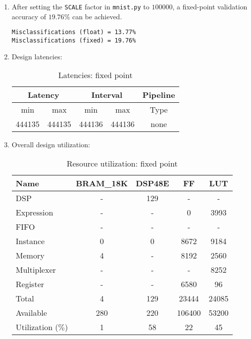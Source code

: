 \documentclass[../main.tex]{subfiles}
\begin{document}
\begin{enumerate}[label=(\arabic*)]
	\item After setting the \texttt{SCALE} factor in \texttt{mnist.py} to $100000$, a fixed-point validation accuracy of $19.76\%$ can be achieved.
		\lstset{
			language=bash,
			basicstyle=\ttfamily
		}
		\begin{lstlisting}
Misclassifications (float) = 13.77%
Misclassifications (fixed) = 19.76%
		\end{lstlisting}

	\item Design latencies:

\begin{table}[H]
	\centering
	\begin{tabular}{ccccc}
		\multicolumn{2}{c}{Latency} & \multicolumn{2}{c}{Interval} & Pipeline\\
		\hline
		min  &   max  &   min  &   max  &   Type  \\
		444135&  444135&  444136&  444136&   none  
	\end{tabular}
	\caption{Latencies: fixed point}
	\label{2-perf-table}
\end{table}

\item Overall design utilization:
\begin{table}[H]
	\centering
	\begin{tabular}{lcccc}
		Name      & BRAM\_18K& DSP48E&   FF   &  LUT  \\
		\hline
		DSP              &        -&    129&       -&      -\\
		Expression       &        -&      -&       0&   3993\\
		FIFO             &        -&      -&       -&      -\\
		Instance         &        0&      0&    8672&   9184\\
		Memory           &        4&      -&    8192&   2560\\
		Multiplexer      &        -&      -&       -&   8252\\
		Register         &        -&      -&    6580&     96\\
		\hline
		Total            &        4&    129&   23444&  24085\\
		Available        &      280&    220&  106400&  53200\\
		\hline
		Utilization ($\%$)  &        1&     58&      22&     45
	\end{tabular}
	\caption{Resource utilization: fixed point}
	\label{2-resources}
\end{table}


\end{enumerate}
\end{document}
